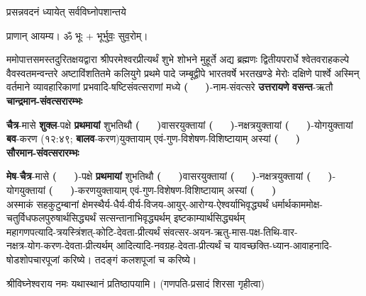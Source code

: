 



{प्रसन्नवदनं ध्यायेत् सर्वविघ्नोपशान्तये}
 
प्राणान् आयम्य। ॐ भूः + भूर्भुवः॒ सुव॒रोम्।


ममोपात्तसमस्तदुरितक्षयद्वारा श्रीपरमेश्वरप्रीत्यर्थं शुभे शोभने मुहूर्ते अद्य ब्रह्मणः
द्वितीयपरार्धे श्वेतवराहकल्पे वैवस्वतमन्वन्तरे अष्टाविंशतितमे कलियुगे प्रथमे पादे
जम्बूद्वीपे भारतवर्षे भरत\-खण्डे मेरोः दक्षिणे पार्श्वे अस्मिन् वर्तमाने व्यावहारिकाणां 
प्रभवादि-षष्टिसंवत्सराणां मध्ये \textbf{(~~~)}-नाम-संवत्सरे \textbf{उत्तरायणे} \textbf{वसन्त}-ऋतौ \\

\textbf{चान्द्रमान-संवत्सरारम्भः}

\textbf{चैत्र}-मासे 	\textbf{शुक्ल}-पक्षे	\textbf{प्रथमायां}  शुभतिथौ	\textbf{(~~~)}\-वासर\-युक्तायां	\textbf{(~~~)}-नक्षत्र\-युक्तायां	\textbf{(~~~)}-योग\-युक्तायां	\textbf{बव}-करण (१२:४९; \textbf{बालव}-करण)\-युक्तायाम्	एवं-गुण-विशेषण-विशिष्टायाम् 	अस्यां \textbf{(~~~)} \\


\textbf{सौरमान-संवत्सरारम्भः}

\textbf{मेष}-\textbf{चैत्र}-मासे 	\textbf{(~~~)}-पक्षे	\textbf{प्रथमायां} शुभतिथौ	\textbf{(~~~)}\-वासर\-युक्तायां	\textbf{(~~~)}-नक्षत्र\-युक्तायां	\textbf{(~~~)}-योग\-युक्तायां	\textbf{(~~~)}-करण\-युक्तायाम्	एवं-गुण-विशेषण-विशिष्टायाम् 	अस्यां \textbf{(~~~)}\\


\noindent अस्माकं सहकुटुम्बानां क्षेमस्थैर्य-धैर्य-वीर्य-विजय-आयुर्-आरोग्य-ऐश्वर्याभि\-वृद्ध्यर्थं
धर्मार्थकाममोक्ष-चतुर्विध\-फल\-पुरुषार्थसिद्ध्यर्थं सत्सन्तानाभि\-वृद्ध्यर्थम् इष्टकाम्यार्थ\-सिद्ध्यर्थम्\\
महागणपत्यादि-त्रयस्त्रिंशत्-कोटि-देवता-प्रीत्यर्थं 
संवत्सर-अयन-ऋतु-मास-पक्ष-तिथि-वार-\\
नक्षत्र-योग-करण-देवता-प्रीत्यर्थम्
आदित्यादि-नवग्रह-देवता-प्रीत्यर्थं च यावच्छक्ति-ध्यान-आवाहनादि-षोडशोपचारपूजां करिष्ये। तदङ्गं कलशपूजां च करिष्ये।

श्रीविघ्नेश्वराय नमः यथास्थानं प्रतिष्ठापयामि।
(गणपति-प्रसादं शिरसा गृहीत्वा)



